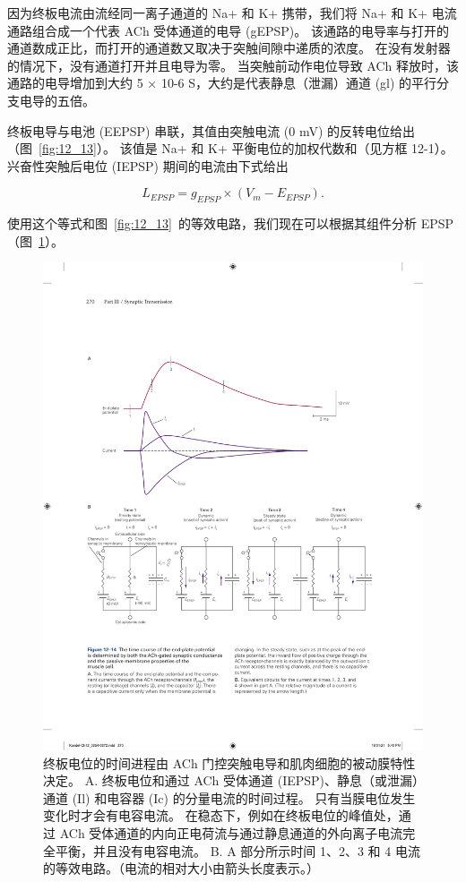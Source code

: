因为终板电流由流经同一离子通道的 Na+ 和 K+ 携带，我们将 Na+ 和 K+ 电流通路组合成一个代表 ACh 受体通道的电导 (gEPSP)。
该通路的电导率与打开的通道数成正比，而打开的通道数又取决于突触间隙中递质的浓度。
在没有发射器的情况下，没有通道打开并且电导为零。
当突触前动作电位导致 ACh 释放时，该通路的电导增加到大约 5 × 10-6 S，大约是代表静息（泄漏）通道 (gl) 的平行分支电导的五倍。


终板电导与电池 (EEPSP) 串联，其值由突触电流 (0 mV) 的反转电位给出（图~\ref{fig:12_13}）。
该值是 Na+ 和 K+ 平衡电位的加权代数和（见方框 12-1）。
兴奋性突触后电位 (IEPSP) 期间的电流由下式给出


\begin{equation}\label{excitatory_potential}
	L_{EPSP} = g_{EPSP} \times (V_m - E_{EPSP}).
\end{equation}


使用这个等式和图~\ref{fig:12_13}~的等效电路，我们现在可以根据其组件分析 EPSP（图~\ref{fig:12_14}）。


\begin{figure}[htbp]
	\centering
	\includegraphics[width=0.95\linewidth]{chap12/fig_12_14}
	\caption{终板电位的时间进程由 ACh 门控突触电导和肌肉细胞的被动膜特性决定。 A. 终板电位和通过 ACh 受体通道 (IEPSP)、静息（或泄漏）通道 (Il) 和电容器 (Ic) 的分量电流的时间过程。 只有当膜电位发生变化时才会有电容电流。 在稳态下，例如在终板电位的峰值处，通过 ACh 受体通道的内向正电荷流与通过静息通道的外向离子电流完全平衡，并且没有电容电流。 B. A 部分所示时间 1、2、3 和 4 电流的等效电路。（电流的相对大小由箭头长度表示。）}
	\label{fig:12_14}
\end{figure}


